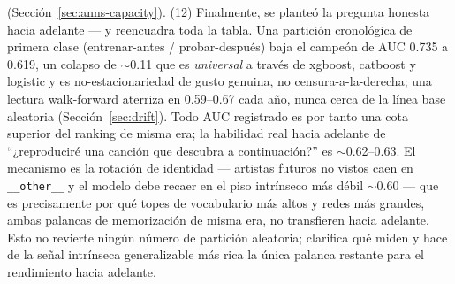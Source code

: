\documentclass[11pt]{article}
\begin{document}
(Sección~\ref{sec:anns-capacity}).
(12) Finalmente, se planteó la pregunta honesta hacia adelante --- y reencuadra toda
la tabla. Una partición cronológica de primera clase (entrenar-antes /
probar-después) baja el campeón de AUC \num{0.735} a \num{0.619}, un colapso de
$\sim$0.11 que es \emph{universal} a través de xgboost, catboost y logistic y es
no-estacionariedad de gusto genuina, no censura-a-la-derecha; una lectura
walk-forward aterriza en \num{0.59}--\num{0.67} cada año, nunca cerca de la línea
base aleatoria (Sección~\ref{sec:drift}). Todo AUC registrado es por tanto una cota
superior del ranking de misma era; la habilidad real hacia adelante de ``¿reproduciré
una canción que descubra a continuación?'' es $\sim$0.62--0.63. El mecanismo es la
rotación de identidad --- artistas futuros no vistos caen en \texttt{\_\_other\_\_} y
el modelo debe recaer en el piso intrínseco más débil $\sim$0.60 --- que es
precisamente por qué topes de vocabulario más altos y redes más grandes, ambas
palancas de memorización de misma era, no transfieren hacia adelante. Esto no
revierte ningún número de partición aleatoria; clarifica qué miden y hace de la señal
intrínseca generalizable más rica la única palanca restante para el rendimiento hacia
adelante.
\end{document}
